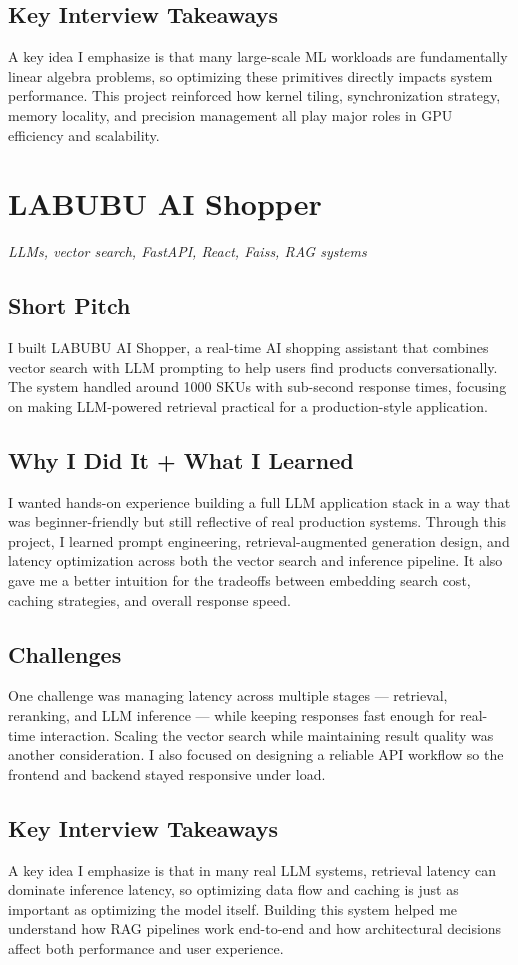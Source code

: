 \documentclass[11pt]{article}
\newcommand{\ProjectHeader}[2]{%
\section*{\textcolor{projectcolor}{#1}}%
\noindent\textit{#2}\par\vspace{0.4em}
}
\begin{document}
\subsection{Key Interview Takeaways}
A key idea I emphasize is that many large-scale ML workloads are fundamentally linear algebra problems, so optimizing these primitives directly impacts system performance. This project reinforced how kernel tiling, synchronization strategy, memory locality, and precision management all play major roles in GPU efficiency and scalability.

\ProjectHeader{LABUBU AI Shopper}{LLMs, vector search, FastAPI, React, Faiss, RAG systems}

\subsection{Short Pitch}
I built LABUBU AI Shopper, a real-time AI shopping assistant that combines vector search with LLM prompting to help users find products conversationally. The system handled around 1000 SKUs with sub-second response times, focusing on making LLM-powered retrieval practical for a production-style application.

\subsection{Why I Did It + What I Learned}
I wanted hands-on experience building a full LLM application stack in a way that was beginner-friendly but still reflective of real production systems. Through this project, I learned prompt engineering, retrieval-augmented generation design, and latency optimization across both the vector search and inference pipeline. It also gave me a better intuition for the tradeoffs between embedding search cost, caching strategies, and overall response speed.

\subsection{Challenges}
One challenge was managing latency across multiple stages — retrieval, reranking, and LLM inference — while keeping responses fast enough for real-time interaction. Scaling the vector search while maintaining result quality was another consideration. I also focused on designing a reliable API workflow so the frontend and backend stayed responsive under load.

\subsection{Key Interview Takeaways}
A key idea I emphasize is that in many real LLM systems, retrieval latency can dominate inference latency, so optimizing data flow and caching is just as important as optimizing the model itself. Building this system helped me understand how RAG pipelines work end-to-end and how architectural decisions affect both performance and user experience.
\end{document}
